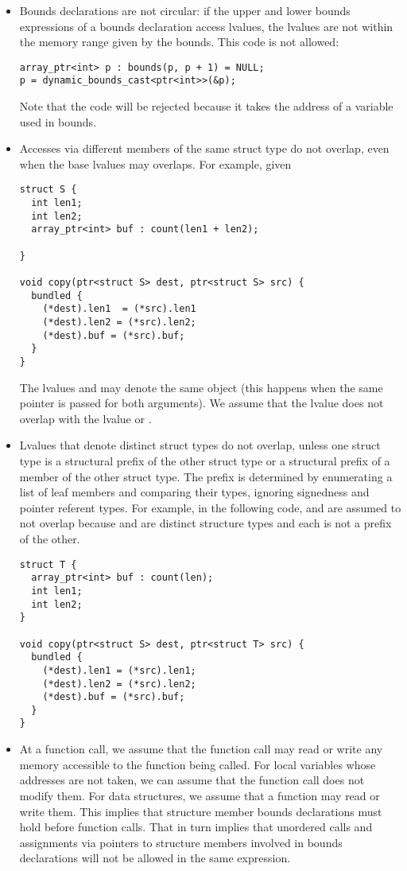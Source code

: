 \begin{itemize}
\item Bounds declarations are not circular: if the upper and lower bounds expressions of a
bounds declaration access lvalues, the lvalues are not within the memory range given
by the bounds. This code is not allowed:
\begin{lstlisting}
array_ptr<int> p : bounds(p, p + 1) = NULL;
p = dynamic_bounds_cast<ptr<int>>(&p);
\end{lstlisting}
Note that the code will be rejected because it takes the address of a variable used in bounds.
\item Accesses via different members of the same struct type do not overlap, even
when the base lvalues may overlaps.  For example, given
\begin{lstlisting}
struct S {
  int len1;
  int len2;
  array_ptr<int> buf : count(len1 + len2);

}

void copy(ptr<struct S> dest, ptr<struct S> src) {
  bundled {
    (*dest).len1  = (*src).len1
    (*dest).len2 = (*src).len2;
    (*dest).buf = (*src).buf;
  }
}
\end{lstlisting}
The lvalues  and  may denote the same object (this happens when the
same pointer is passed for both arguments). We assume that the lvalue 
does not overlap with the lvalue  or .
\item Lvalues that denote distinct struct types do not overlap, unless one struct type is 
a structural prefix of the other struct type or a structural prefix of a member of the other struct type.
The prefix is determined by enumerating a list of leaf members
and comparing their types, ignoring signedness and pointer referent types.   
For example, in the following code,
 and  are assumed to not overlap because  and 
are distinct structure types and each is not a prefix of the other.
\begin{lstlisting}
struct T {
  array_ptr<int> buf : count(len);
  int len1;
  int len2;
}

void copy(ptr<struct S> dest, ptr<struct T> src) {
  bundled {
    (*dest).len1 = (*src).len1;
    (*dest).len2 = (*src).len2;
    (*dest).buf = (*src).buf;
  }
}
\end{lstlisting}
\item At a function call, we assume that the function call may read or write any memory accessible
to the function being called.  For local variables whose addresses are not taken, we can assume that 
the function call does not modify them. For data structures, we assume that a function may read or 
write them.  This implies that structure member bounds declarations must hold before function calls.
That in turn implies that unordered calls and assignments via pointers to structure members involved
in bounds declarations will not be allowed in the same expression.


\end{itemize}
